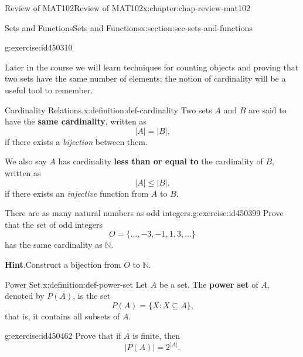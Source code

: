 \documentclass[oneside,10pt,]{book}
\newcommand{\blocktitlefont}{\relax}
\newcommand{\terminology}[1]{\textbf{#1}}
\numberwithin{equation}{section}
\begin{document}
\begin{chapterptx}{Review of MAT102}{}{Review of MAT102}{}{}{x:chapter:chap-review-mat102}
\begin{sectionptx}{Sets and Functions}{}{Sets and Functions}{}{}{x:section:sec-sets-and-functions}
\begin{inlineexercise}{}{g:exercise:id450310}
\end{inlineexercise}
Later in the course we will learn techniques for counting objects and proving that two sets have the same number of elements; the notion of cardinality will be a useful tool to remember.%
\begin{definition}{Cardinality Relations.}{x:definition:def-cardinality}%
\label{g:notation:id450343}\label{g:notation:id450324} Two sets \(A\) and \(B\) are said to have the \terminology{same cardinality}, written as%
\begin{equation*}
|A| = |B|\text{,}
\end{equation*}
if there exists a \emph{bijection} between them.%
\par
We also say \(A\) has cardinality \terminology{less than or equal to} the cardinality of \(B\), written as%
\begin{equation*}
|A| \leq |B|\text{,}
\end{equation*}
if there exists an \emph{injective} function from \(A\) to \(B\).%
\end{definition}
\begin{inlineexercise}{There are as many natural numbers as odd integers.}{g:exercise:id450399}%
Prove that the set of odd integers%
\begin{equation*}
O = \{\ldots,-3,-1,1,3,\ldots\}
\end{equation*}
has the same cardinality as \(\mathbb{N}\).%
\par\smallskip%
\noindent\textbf{\blocktitlefont Hint}.\hypertarget{g:hint:id450402}{}\quad{}Construct a bijection from \(O\) to \(\mathbb{N}\).%
\end{inlineexercise}
\begin{definition}{Power Set.}{x:definition:def-power-set}%
\label{g:notation:id450421} Let \(A\) be a set. The \terminology{power set} of \(A\), denoted by \(P(A)\), is the set%
\begin{equation*}
P(A) = \{X : X \subseteq A\}\text{,}
\end{equation*}
that is, it contains all subsets of \(A\).%
\end{definition}
\begin{inlineexercise}{}{g:exercise:id450462}%
Prove that if \(A\) is finite, then%
\begin{equation*}
|P(A)| = 2^{|A|}\text{.}
\end{equation*}
%
\end{inlineexercise}
\end{sectionptx}
%
%
\typeout{************************************************}

\end{chapterptx}
\end{document}

